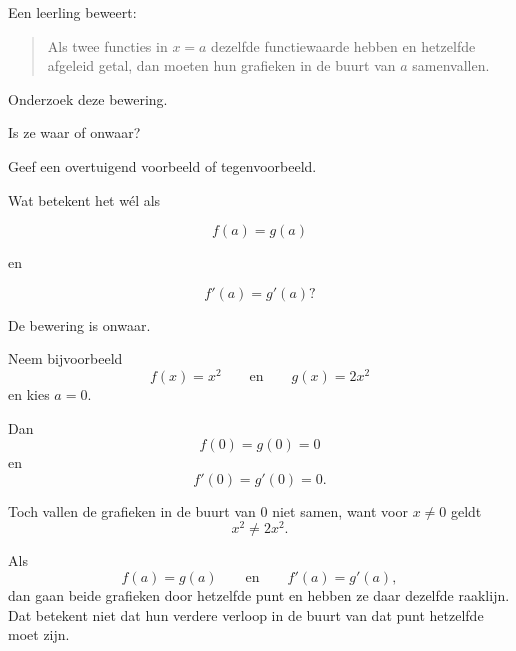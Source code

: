 \documentclass{ximera}
\begin{document}

\begin{oefening}{\oefG}

Een leerling beweert:

\begin{quote}
Als twee functies in $x=a$ dezelfde functiewaarde hebben en
hetzelfde afgeleid getal, dan moeten hun grafieken in de buurt van
$a$ samenvallen.
\end{quote}

Onderzoek deze bewering.

\begin{question}
Is ze waar of onwaar?
\end{question}

\begin{question}
Geef een overtuigend voorbeeld of tegenvoorbeeld.
\end{question}

\begin{question}
Wat betekent het wél als

\[
f(a)=g(a)
\]

en

\[
f'(a)=g'(a)?
\]
\end{question}

\begin{oplossing}

De bewering is onwaar.

Neem bijvoorbeeld
\[
f(x)=x^2
\qquad\text{en}\qquad
g(x)=2x^2
\]
en kies $a=0$.

Dan
\[
f(0)=g(0)=0
\]
en
\[
f'(0)=g'(0)=0.
\]

Toch vallen de grafieken in de buurt van $0$ niet samen, want voor
$x\neq0$ geldt
\[
x^2\neq2x^2.
\]

Als
\[
f(a)=g(a)
\qquad\text{en}\qquad
f'(a)=g'(a),
\]
dan gaan beide grafieken door hetzelfde punt en hebben ze daar dezelfde
raaklijn. Dat betekent niet dat hun verdere verloop in de buurt van dat
punt hetzelfde moet zijn.

\end{oplossing}

\end{oefening}
\end{document}
